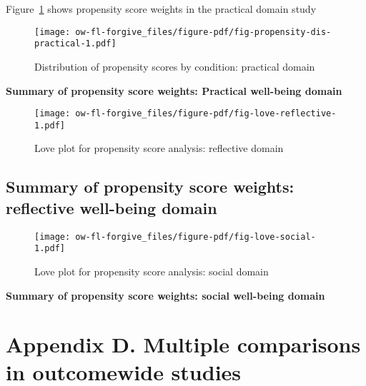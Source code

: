\documentclass[
  singlecolumn]{report}
\begin{document}
Figure~\ref{fig-propensity-dis-practical} shows propensity score weights
in the practical domain study

\begin{figure}

{\centering \texttt{[image: ow-fl-forgive\_files/figure-pdf/fig-propensity-dis-practical-1.pdf]}

}

\caption{\label{fig-propensity-dis-practical}Distribution of propensity
scores by condition: practical domain}

\end{figure}

\textbf{Summary of propensity score weights: Practical well-being
domain}

\begin{figure}

{\centering \texttt{[image: ow-fl-forgive\_files/figure-pdf/fig-love-reflective-1.pdf]}

}

\caption{\label{fig-love-reflective}Love plot for propensity score
analysis: reflective domain}

\end{figure}

\hypertarget{summary-of-propensity-score-weights-reflective-well-being-domain}{%
\subsection{\texorpdfstring{\textbf{Summary of propensity score weights:
reflective well-being
domain}}{Summary of propensity score weights: reflective well-being domain}}\label{summary-of-propensity-score-weights-reflective-well-being-domain}}

\begin{figure}

{\centering \texttt{[image: ow-fl-forgive\_files/figure-pdf/fig-love-social-1.pdf]}

}

\caption{\label{fig-love-social}Love plot for propensity score analysis:
social domain}

\end{figure}

\textbf{Summary of propensity score weights: social well-being domain}

\newpage{}

\hypertarget{appendix-d.-multiple-comparisons-in-outcomewide-studies}{%
\section{Appendix D. Multiple comparisons in outcomewide
studies}\label{appendix-d.-multiple-comparisons-in-outcomewide-studies}}
\end{document}
